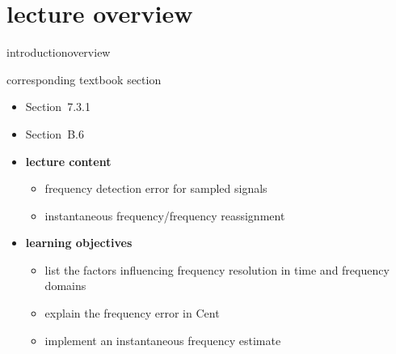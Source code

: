 


\subtitle{Module B.6: Instantaneous Frequency}


	

    \section[overview]{lecture overview}
        \begin{frame}{introduction}{overview}
            \begin{block}{corresponding textbook section}
                \begin{itemize}
                    \item Section~7.3.1
                    \item Section~B.6
                \end{itemize}
            \end{block}

            \begin{itemize}
                \item   \textbf{lecture content}
                    \begin{itemize}
                        \item   frequency detection error for sampled signals
                        \item   instantaneous frequency/frequency reassignment
                    \end{itemize}
                \bigskip
                \item<2->   \textbf{learning objectives}
                    \begin{itemize}
                        \item   list the factors influencing frequency resolution in time and frequency domains
                        \item   explain the frequency error in Cent
                        \item   implement an instantaneous frequency estimate
                    \end{itemize}
            \end{itemize}
        \end{frame}

